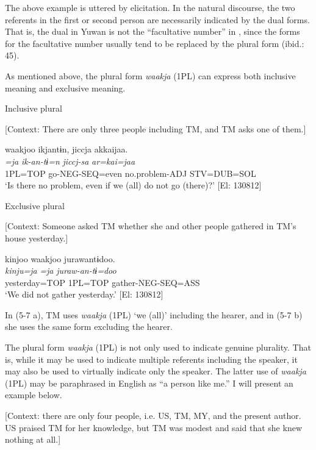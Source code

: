 The above example is uttered by elicitation. In the natural discourse, the two referents in the first or second person are necessarily indicated by the dual forms. That is, the dual in Yuwan is not the “facultative number” in \citet{Corbett2000}, since the forms for the facultative number usually tend to be replaced by the plural form (ibid.: 45).

As mentioned above, the plural form \textit{waakja} (1PL) can express both inclusive meaning and exclusive meaning.

\ea \label{ex:5:7}  \ea \label{ex:5:7a} Inclusive plural

    [Context: There are only three people including TM, and TM asks one of them.]

\glll  waakjoo  ikjantɨn,  jiccja  akkaijaa.\\
\textit{=ja}  \textit{ik-an-tɨ=n}  \textit{jiccj-sa}  \textit{ar=kai=jaa}\\
1PL=TOP  go-NEG-SEQ=even  no.problem-ADJ  STV=DUB=SOL\\
\glt ‘Is there no problem, even if we (all) do not go (there)?’ [El: 130812]

 \ex \label{ex:5:b} Exclusive plural

    [Context: Someone asked TM whether she and other people gathered in TM’s house yesterday.]

\glll  kinjoo  waakjoo  jurawantɨdoo.\\
\textit{kinju=ja}  \textit{=ja}  \textit{juraw-an-tɨ=doo}\\
yesterday=TOP  1PL=TOP  gather-NEG-SEQ=ASS\\
\glt ‘We did not gather yesterday.’ [El: 130812]
\z
\z

In (5-7 a), TM uses \textit{waakja} (1PL) ‘we (all)’ including the hearer, and in (5-7 b) she uses the same form excluding the hearer.

  The plural form \textit{waakja} (1PL) is not only used to indicate genuine plurality. That is, while it may be used to indicate multiple referents including the speaker, it may also be used to virtually indicate only the speaker. The latter use of \textit{waakja} (1PL) may be paraphrased in English as “a person like me.” I will present an example below.

\ea \label{ex:5:8}   [Context: there are only four people, i.e. US, TM, MY, and the present author. US praised TM for her knowledge, but TM was modest and said that she knew nothing at all.]


